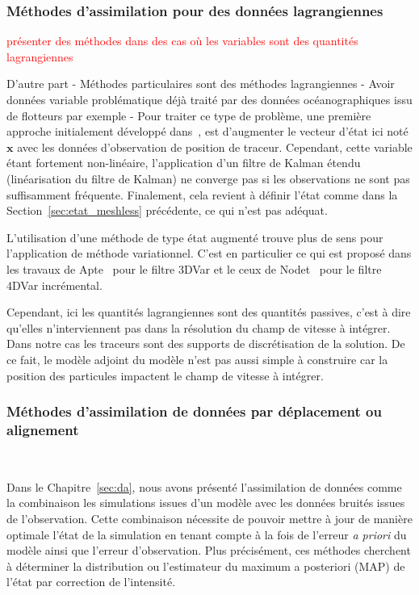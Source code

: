 \subsubsection{Méthodes d'assimilation pour des données lagrangiennes}
\textcolor{red}{présenter des méthodes dans des cas où les variables sont des quantités lagrangiennes}

D'autre part
- Méthodes particulaires sont des méthodes lagrangiennes
- Avoir données variable problématique déjà traité par des données océanographiques issu de flotteurs par exemple
- Pour traiter ce type de problème, une première approche initialement développé dans~\cite{ide_2002}, est d'augmenter le vecteur d'état ici noté $\bm x$ avec les données d'observation de position de traceur. Cependant, cette variable étant fortement non-linéaire, l'application d'un filtre de Kalman étendu (linéarisation du filtre de Kalman) ne converge pas si les observations ne sont pas suffisamment fréquente. Finalement, cela revient à définir l'état comme dans la Section~\ref{sec:etat_meshless} précédente, ce qui n'est pas adéquat.

L'utilisation d'une méthode de type état augmenté trouve plus de sens pour l'application de méthode variationnel.
C'est en particulier ce qui est proposé dans les travaux de Apte~\cite{apte_2008} pour le filtre 3DVar et le ceux de Nodet~\cite{nodet_2006} pour le filtre 4DVar incrémental.

Cependant, ici les quantités lagrangiennes sont des quantités passives, c'est à dire qu'elles n'interviennent pas dans la résolution du champ de vitesse à intégrer. Dans notre cas les traceurs sont des supports de discrétisation de la solution. De ce fait, le modèle adjoint du modèle n'est pas aussi simple à construire car la position des particules impactent le champ de vitesse à intégrer.


\subsubsection{Méthodes d'assimilation de données par déplacement ou alignement}~\label{sec:biblio_align}

Dans le Chapitre~\ref{sec:da}, nous avons présenté l'assimilation de données comme la combinaison les simulations issues d'un modèle avec les données bruités issues de l'observation. Cette combinaison nécessite de pouvoir mettre à jour de manière optimale l'état de la simulation en tenant compte à la fois de l'erreur \textit{a priori} du modèle ainsi que l'erreur d'observation. Plus précisément, ces méthodes cherchent à déterminer la distribution ou l'estimateur du maximum a posteriori (MAP) de l'état par correction de l'intensité.

